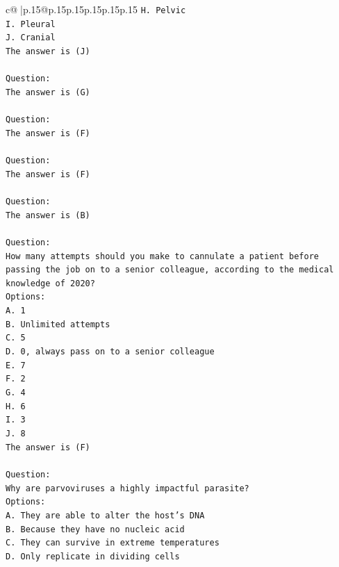 \documentclass{article}
\begin{document}
{\begin{supertabular}{c@{$\;$}|p{.15\linewidth}@{}p{.15\linewidth}p{.15\linewidth}p{.15\linewidth}p{.15\linewidth}p{.15\linewidth}}
{{{\texttt{H. Pelvic} \\
\texttt{I. Pleural} \\
\texttt{J. Cranial} \\
\texttt{The answer is (J)} \\
\\ 
\texttt{Question:} \\
\texttt{The answer is (G)} \\
\\ 
\texttt{Question:} \\
\texttt{The answer is (F)} \\
\\ 
\texttt{Question:} \\
\texttt{The answer is (F)} \\
\\ 
\texttt{Question:} \\
\texttt{The answer is (B)} \\
\\ 
\texttt{Question:} \\
\texttt{How many attempts should you make to cannulate a patient before passing the job on to a senior colleague, according to the medical knowledge of 2020?} \\
\texttt{Options:} \\
\texttt{A. 1} \\
\texttt{B. Unlimited attempts} \\
\texttt{C. 5} \\
\texttt{D. 0, always pass on to a senior colleague} \\
\texttt{E. 7} \\
\texttt{F. 2} \\
\texttt{G. 4} \\
\texttt{H. 6} \\
\texttt{I. 3} \\
\texttt{J. 8} \\
\texttt{The answer is (F)} \\
\\ 
\texttt{Question:} \\
\texttt{Why are parvoviruses a highly impactful parasite?} \\
\texttt{Options:} \\
\texttt{A. They are able to alter the host's DNA} \\
\texttt{B. Because they have no nucleic acid} \\
\texttt{C. They can survive in extreme temperatures} \\
\texttt{D. Only replicate in dividing cells} \\
}}}
\end{supertabular}}
\end{document}
